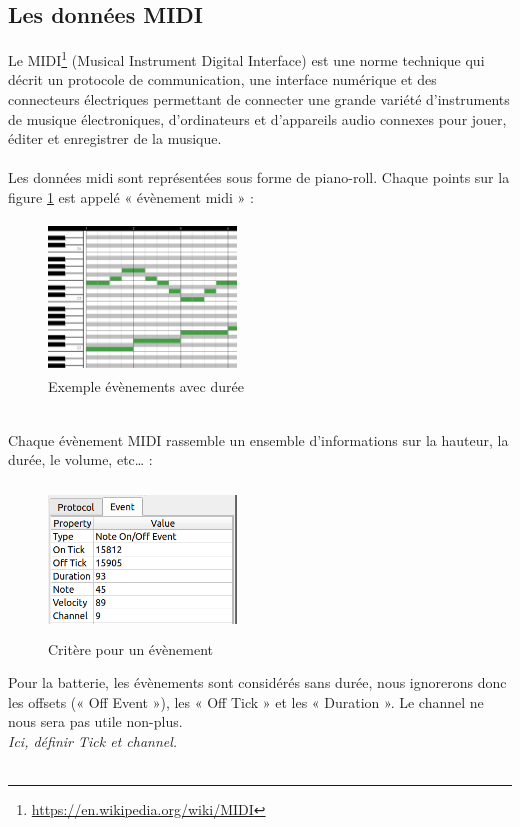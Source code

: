 \subsection*{Les données MIDI}
Le MIDI\footnote{\url{https://en.wikipedia.org/wiki/MIDI}} (Musical Instrument Digital Interface) est une norme technique qui décrit un protocole de communication, une interface numérique et des connecteurs électriques permettant de connecter une grande variété d'instruments de musique électroniques, d'ordinateurs et d'appareils audio connexes pour jouer, éditer et enregistrer de la musique.\\\\
Les données midi sont représentées sous forme de piano-roll. Chaque points sur la figure \ref{piano_roll} est appelé « évènement midi » :
\begin{figure}[!h]
	\centering
	\includegraphics[height=40mm, width=50mm]{z_images/1_contexte/2_midi_piano.jpg}
	\caption{Exemple évènements avec durée}
	\label{piano_roll}
\end{figure}\\
Chaque évènement MIDI rassemble un ensemble d’informations sur la hauteur, la durée, le volume, etc… :
\begin{figure}[h!]
	\centering
	\includegraphics[height=40mm, width=50mm]{z_images/1_contexte/3_evenements_midi.png}
	\caption{Critère pour un évènement}
\end{figure}\newpage
Pour la batterie, les évènements sont considérés sans durée, nous ignorerons donc les offsets (« Off Event »), les « Off Tick » et les « Duration ». Le channel ne nous sera pas utile non-plus.\\
\textit{Ici, définir Tick et channel.}\\\\
